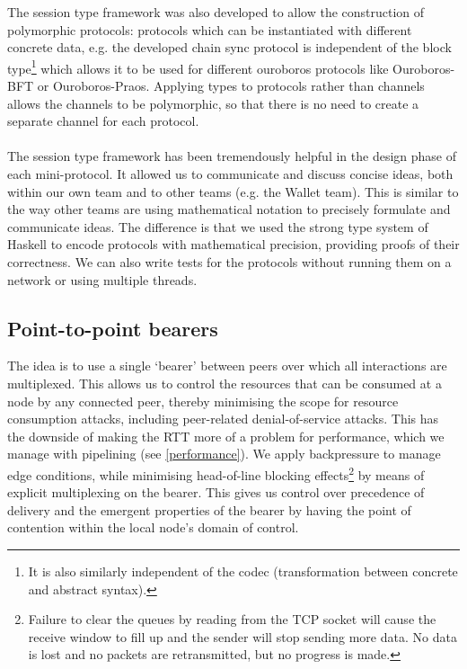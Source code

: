 \documentclass[11pt,a4paper]{article}
\begin{document}
The session type framework was also developed to allow the construction
of polymorphic protocols: protocols which can be instantiated with
different concrete data, e.g. the developed chain sync protocol is
independent of the block type\footnote{It is also similarly independent
  of the codec (transformation between concrete and abstract syntax).}
which allows it to be used for different ouroboros protocols like
Ouroboros-BFT or Ouroboros-Praos. Applying types to protocols rather
than channels allows the channels to be polymorphic, so that there is no
need to create a separate channel for each protocol.\\
~\\
The session type framework has been tremendously helpful in the design
phase of each mini-protocol. It allowed us to communicate and discuss
concise ideas, both within our own team and to other teams (e.g. the
Wallet team). This is similar to the way other teams are using
mathematical notation to precisely formulate and communicate ideas. The
difference is that we used the strong type system of Haskell to encode
protocols with mathematical precision, providing proofs of their
correctness. We can also write tests for the protocols without running
them on a network or using multiple threads.

\subsection{Point-to-point bearers}
\label{point-to-point-bearers}

The idea is to use a single `bearer' between peers over which all
interactions are multiplexed. This allows us to control the resources
that can be consumed at a node by any connected peer, thereby minimising
the scope for resource consumption attacks, including peer-related
denial-of-service attacks. This has the downside of making the RTT more
of a problem for performance, which we manage with pipelining (see
\cref{performance}). We apply backpressure to
manage edge conditions, while minimising head-of-line blocking
effects\footnote{Failure to clear the queues by reading from the TCP
  socket will cause the receive window to fill up and the sender will
  stop sending more data. No data is lost and no packets are
  retransmitted, but no progress is made.} by means of explicit
multiplexing on the bearer. This gives us control over precedence of
delivery and the emergent properties of the bearer by having the point
of contention within the local node's domain of control.
\end{document}
